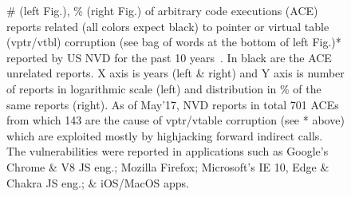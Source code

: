 \begin{figure}[t!]
\centering
{}
\vspace{-.5cm}
\caption{\# (left Fig.), \% (right Fig.) of arbitrary code executions (ACE) reports related (all colors expect black) to pointer or virtual table (vptr/vtbl) corruption 
(see bag of words at the bottom of left Fig.)* reported by US NVD for the past 10 years~\cite{NVD:ACE}. In black are the ACE unrelated reports.
X axis is years (left \& right) and Y axis is number of reports in logarithmic scale (left) and distribution in \% of the same reports (right).
As of May'17, NVD reports in total 701 ACEs from which 143 are the cause of vptr/vtable corruption (see * above) 
which are exploited mostly by highjacking forward indirect calls.
The vulnerabilities were reported in applications such as Google's Chrome \& V8 JS eng.; Mozilla Firefox; Microsoft's IE 10, Edge \& Chakra JS eng.;
\& iOS/MacOS apps.}
\label{ace:nvd:statistics}
\vspace{-.7cm}
\end{figure}

